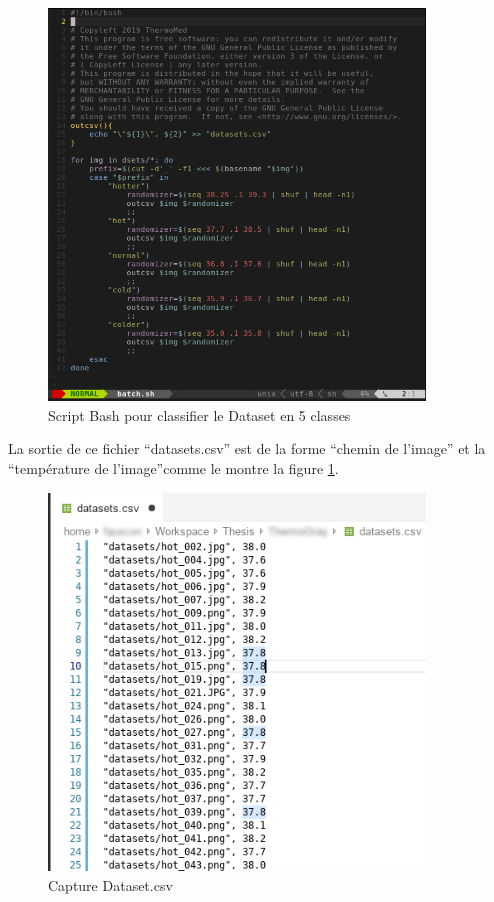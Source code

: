 \documentclass[12pt]{article}
\begin{document}
\newpage
\begin{figure}[h]
	\centering
	\includegraphics[width=10cm]{img-Chapiter-4/batch.png}
	\caption{Script Bash pour classifier le Dataset en 5 classes}
\end{figure}


La sortie de ce fichier “datasets.csv” est de la forme “chemin de l’image” et la “température de l’image”comme le montre la figure  \ref{fig:dataset.csv}.

\newpage
\begin{figure}[h]
	\centering
	\includegraphics[width=10cm]{img-Chapiter-4/datasets.png}
	\caption{Capture Dataset.csv}
	\label{fig:dataset.csv}
\end{figure}
\end{document}
